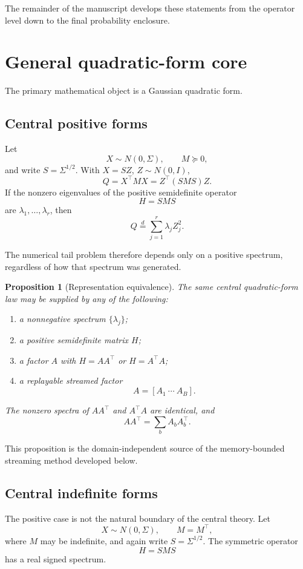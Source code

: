 \documentclass[11pt]{article}
\newtheorem{proposition}[theorem]{Proposition}
\theoremstyle{definition}
\theoremstyle{remark}
\begin{document}
The remainder of the manuscript develops these statements from the operator
level down to the final probability enclosure.


\section{General quadratic-form core}

The primary mathematical object is a Gaussian quadratic form.

\subsection{Central positive forms}

Let
\[
X\sim N(0,\Sigma),
\qquad
M\succeq0,
\]
and write \(S=\Sigma^{1/2}\).  With \(X=SZ\), \(Z\sim N(0,I)\),
\[
Q=X^\top MX
=
Z^\top(SMS)Z.
\]
If the nonzero eigenvalues of the positive semidefinite operator
\[
H=SMS
\]
are \(\lambda_1,\ldots,\lambda_r\), then
\[
\boxed{
Q\overset d=
\sum_{j=1}^r\lambda_jZ_j^2.
}
\]

The numerical tail problem therefore depends only on a positive spectrum,
regardless of how that spectrum was generated.

\begin{proposition}[Representation equivalence]
The same central quadratic-form law may be supplied by any of the following:
\begin{enumerate}
\item a nonnegative spectrum \(\{\lambda_j\}\);
\item a positive semidefinite matrix \(H\);
\item a factor \(A\) with \(H=AA^\top\) or \(H=A^\top A\);
\item a replayable streamed factor
\[
A=[A_1\ \cdots\ A_B].
\]
\end{enumerate}
The nonzero spectra of \(AA^\top\) and \(A^\top A\) are identical, and
\[
AA^\top=\sum_bA_bA_b^\top.
\]
\end{proposition}

This proposition is the domain-independent source of the memory-bounded
streaming method developed below.

\subsection{Central indefinite forms}

The positive case is not the natural boundary of the central theory.  Let
\[
X\sim N(0,\Sigma),
\qquad
M=M^\top,
\]
where $M$ may be indefinite, and again write $S=\Sigma^{1/2}$.  The symmetric
operator
\[
H=SMS
\]
has a real signed spectrum.
\end{document}
